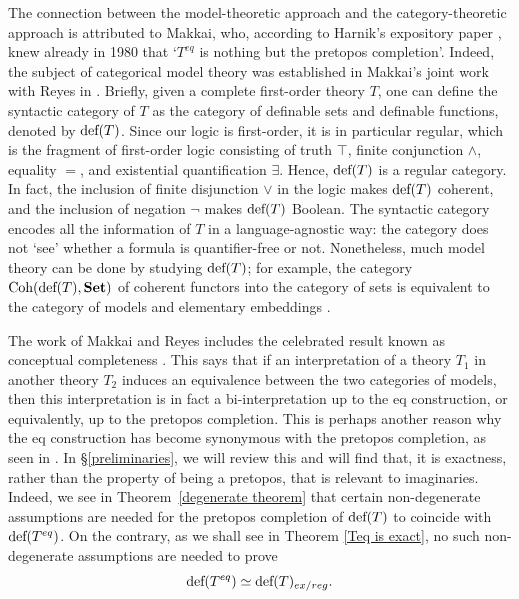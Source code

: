 The connection between the model-theoretic approach and the category-theoretic approach is attributed to Makkai, who, according to Harnik's expository paper \cite{harnik}, knew already in 1980 that `$T^{eq}$ is nothing but the pretopos completion'. Indeed, the subject of categorical model theory was established in Makkai's joint work with Reyes in \cite{alma992977584040101631}. Briefly, given a complete first-order theory $T$, one can define the syntactic category of $T$ as the category of definable sets and definable functions, denoted by $\textup{def}(T)$. Since our logic is first-order, it is in particular regular, which is the fragment of first-order logic consisting of truth $\top$, finite conjunction $\wedge$, equality $=$, and existential quantification $\exists$. Hence, $\textup{def}(T)$ is a regular category. In fact, the inclusion of finite disjunction $\vee$ in the logic makes $\textup{def}(T)$ coherent, and the inclusion of negation $\neg$ makes $\textup{def}(T)$ Boolean. The syntactic category encodes all the information of $T$ in a language-agnostic way: the category does not `see' whether a formula is quantifier-free or not. Nonetheless, much model theory can be done by studying $\textup{def}(T)$; for example, the category $\textup{Coh}(\textup{def}(T),\textbf{Set})$ of coherent functors into the category of sets is equivalent to the category of models and elementary embeddings \cite[Ch. 8 \S1]{alma992977584040101631}. 

\smallskip 

The work of Makkai and Reyes includes the celebrated result known as conceptual completeness \cite[Ch. 7]{alma992977584040101631}. This says that if an interpretation of a theory $T_1$ in another theory $T_2$ induces an equivalence between the two categories of models, then this interpretation is in fact a bi-interpretation up to the eq construction, or equivalently, up to the pretopos completion. This is perhaps another reason why the eq construction has become synonymous with the pretopos completion, as seen in \cite{harnik}. In \S\ref{preliminaries}, we will review this and will find that, it is exactness, rather than the property of being a pretopos, that is relevant to imaginaries. Indeed, we see in Theorem~\ref{degenerate theorem} that certain non-degenerate assumptions are needed for the pretopos completion of $\textup{def}(T)$ to coincide with $\textup{def}(T^{eq})$. On the contrary, as we shall see in Theorem \ref{Teq is exact}, no such non-degenerate assumptions are needed to prove 
\[\textup{def}(T^{eq})\simeq\textup{def}(T)_{ex/reg}.\]

